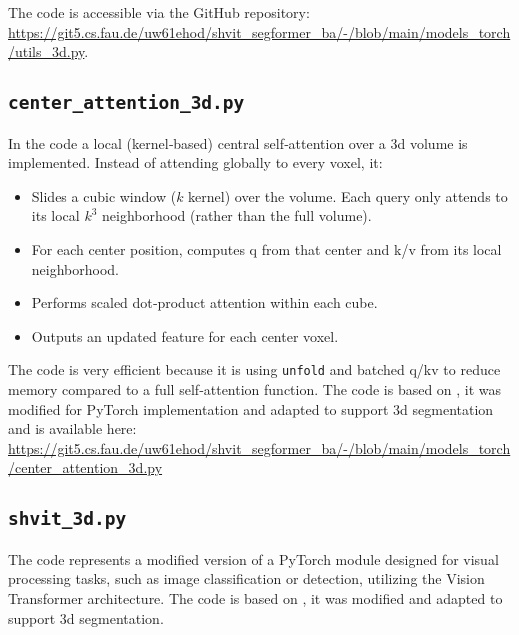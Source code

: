 The code is accessible via the GitHub repository: \url{https://git5.cs.fau.de/uw61ehod/shvit_segformer_ba/-/blob/main/models_torch/utils_3d.py}.



\subsection{{\tt center\_attention\_3d.py}} \label{sec::center_attention_3d.py}
In the code a local (kernel‑based) central self‑attention over a \gls{3d} volume is implemented. Instead of attending globally to every voxel, it:
\begin{itemize}
	\item Slides a cubic window ($k$ kernel) over the volume. Each query only attends to its local $k^3$ neighborhood (rather than the full volume).
	\item For each center position, computes \gls{q} from that center and \gls{k}/\gls{v} from its local neighborhood.
	\item Performs scaled dot‑product attention within each cube.
	\item Outputs an updated feature for each center voxel.
\end{itemize}
The code is very efficient because it is using {\tt unfold} and batched \gls{q}/\gls{k}\gls{v} to reduce memory compared to a full self‑attention function. The code is based on \cite{Li_2022}, it was modified for PyTorch implementation and adapted to support \gls{3d} segmentation and is available here: \url{https://git5.cs.fau.de/uw61ehod/shvit_segformer_ba/-/blob/main/models_torch/center_attention_3d.py}




\subsection{{\tt shvit\_3d.py}} \label{sec::shvid_3d.py}
The code represents a modified version of a PyTorch module designed for visual processing tasks, such as image classification or detection, utilizing the Vision Transformer architecture. The code is based on \cite{yun2024shvit}, it was modified and adapted to support \gls{3d} segmentation.

\medskip


